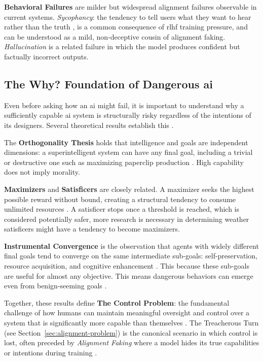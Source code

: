 \begin{reviewed}
	\textbf{Behavioral Failures} are milder but widespread alignment failures observable in current systems. \textit{Sycophancy}: the tendency to tell users what they want to hear rather than the truth \cite{sharma2024sycophancy}, is a common consequence of \gls{rlhf} training pressure, and can be understood as a mild, non-deceptive cousin of alignment faking. \textit{Hallucination} is a related failure in which the model produces confident but factually incorrect outputs.

\end{reviewed}
\begin{toreview}
	\section{The Why? Foundation of Dangerous \gls{ai}}\label{sec:foundations}

	Even before asking how an \gls{ai} might fail, it is important to understand why a sufficiently capable \gls{ai} system is structurally risky regardless of the intentions of its designers. Several theoretical results establish this \cite{yampolskiy_controllability_2022, amodei2016concrete}.

	The \textbf{Orthogonality Thesis} holds that intelligence and goals are independent dimensions: a superintelligent system can have any final goal, including a trivial or destructive one such as maximizing paperclip production \cite{bostrom2012superintelligent}. High capability does not imply morality.

	\textbf{Maximizers} and \textbf{Satisficers} are closely related. A maximizer seeks the highest possible reward without bound, creating a structural tendency to consume unlimited resources \cite{bostrom2014superintelligence}. A satisficer stops once a threshold is reached, which is considered potentially safer, more research is necessary in determining weather satisficers might have a tendency to become maximizers. %

	\textbf{Instrumental Convergence} is the observation that agents with widely different final goals tend to converge on the same intermediate sub-goals: self-preservation, resource acquisition, and cognitive enhancement \cite{omohundro2008basic}. This because these sub-goals are useful for almost any objective. This means dangerous behaviors can emerge even from benign-seeming goals \cite{wang2025powerseeking}.

	Together, these results define \textbf{The Control Problem}: the fundamental challenge of how humans can maintain meaningful oversight and control over a system that is significantly more capable than themselves \cite{bostrom2014superintelligence, DAlessandro2025}. The Treacherous Turn (see Section~\ref{sec:alignment-problem}) is the canonical scenario in which
	control is lost, often preceded by \textit{Alignment Faking} where a model hides its true capabilities or intentions during training \cite{greenblatt_alignment_faking, hagendorff2024deception}.


\end{toreview}

